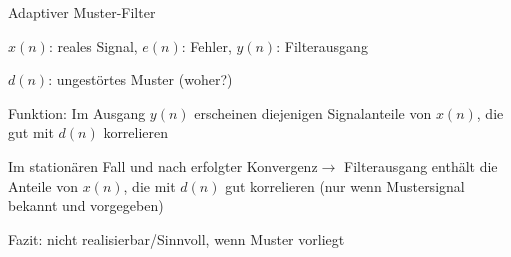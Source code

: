 \documentclass[a4paper]{article}
\begin{document}
\begin{multicols}{3}

  Adaptiver Muster-Filter
  \begin{itemize*}
    \item $x(n)$: reales Signal, $e(n)$: Fehler, $y(n)$: Filterausgang
    \item $d(n)$: ungestörtes Muster (woher?)
    \item Funktion: Im Ausgang $y(n)$ erscheinen diejenigen Signalanteile von $x(n)$, die gut mit $d(n)$ korrelieren
    \item Im stationären Fall und nach erfolgter Konvergenz$\rightarrow$ Filterausgang enthält die Anteile von $x(n)$, die mit $d(n)$ gut korrelieren (nur wenn Mustersignal bekannt und vorgegeben)
    \item Fazit: nicht realisierbar/Sinnvoll, wenn Muster vorliegt
  \end{itemize*}


\end{multicols}
\end{document}
